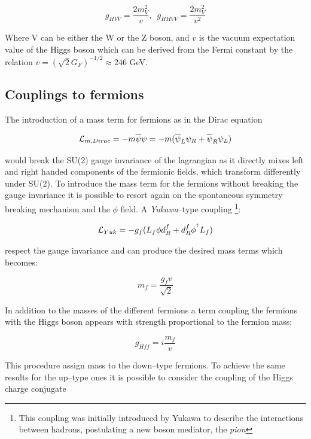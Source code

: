 \begin{equation}
g_{HVV}=\frac{2m^2_V}{v}, \,\,\,   g_{HHVV}=\frac{2m^2_V}{v^2}
\end{equation}

Where V can be either the W or the Z boson, and $v$ is the vacuum expectation value of the Higgs boson which can be derived from the Fermi constant by the relation $v = (\sqrt{2}G_F)^{-1/2} \approx 246$ GeV.

\subsection{Couplings to fermions}

The introduction of a mass term for fermions as in the Dirac equation 

\begin{equation}
\mathcal{L}_{m,Dirac}= -m\overline{\psi}\psi=-m(\overline{\psi}_L\psi_R+\overline{\psi}_R\psi_L)
\end{equation}

would break the SU(2) gauge invariance of the lagrangian as it directly mixes left and right handed components of the fermionic fields, which transform differently under SU(2). To introduce the mass term for the fermions without breaking the gauge invariance it is possible to resort again on the spontaneous symmetry breaking mechanism and the $\phi$ field. A \emph{Yukawa}--type coupling
\footnote{This coupling was initially introduced by Yukawa \cite{Yukawa:1935xg} to describe the interactions between hadrons, postulating a new boson mediator, the \emph{pion}}:

\begin{equation}
\mathcal{L}_{Yuk}=-g_f(L_f \phi d^f_R + d^f_R \phi^{^\dagger} L_f)
\end{equation}

respect the gauge invariance and can produce the desired mass terms which becomes:

\begin{equation}
m_f = \frac{g_f v}{\sqrt{2}}
\end{equation}

In addition to the masses of the different fermions a term coupling the fermions with the Higgs boson appears with strength proportional to the fermion mass:

\begin{equation}
g_{Hff}=i\frac{m_f}{v}
\end{equation}

This procedure assign mass to the down--type fermions. To achieve the same results for the up--type ones it is possible to consider the coupling of the Higgs charge conjugate

